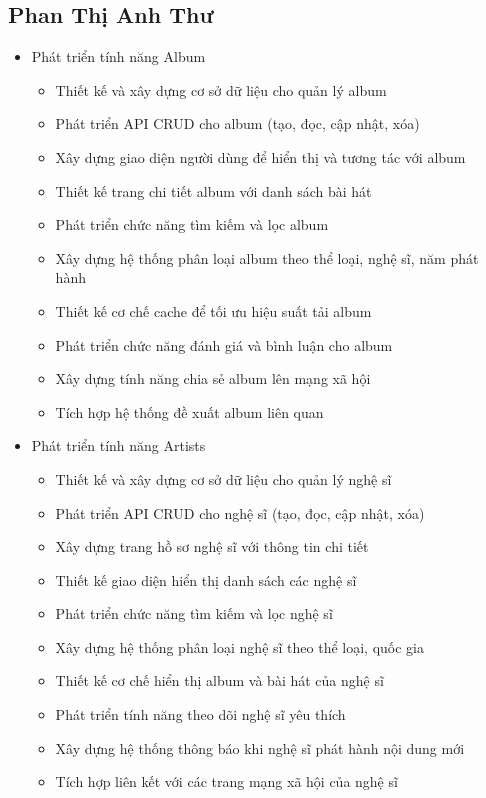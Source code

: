 \subsection{Phan Thị Anh Thư}
\begin{itemize}
    \item Phát triển tính năng Album
    \begin{itemize}
        \item Thiết kế và xây dựng cơ sở dữ liệu cho quản lý album
        \item Phát triển API CRUD cho album (tạo, đọc, cập nhật, xóa)
        \item Xây dựng giao diện người dùng để hiển thị và tương tác với album
        \item Thiết kế trang chi tiết album với danh sách bài hát
        \item Phát triển chức năng tìm kiếm và lọc album
        \item Xây dựng hệ thống phân loại album theo thể loại, nghệ sĩ, năm phát hành
        \item Thiết kế cơ chế cache để tối ưu hiệu suất tải album
        \item Phát triển chức năng đánh giá và bình luận cho album
        \item Xây dựng tính năng chia sẻ album lên mạng xã hội
        \item Tích hợp hệ thống đề xuất album liên quan
    \end{itemize}
    
    \item Phát triển tính năng Artists
    \begin{itemize}
        \item Thiết kế và xây dựng cơ sở dữ liệu cho quản lý nghệ sĩ
        \item Phát triển API CRUD cho nghệ sĩ (tạo, đọc, cập nhật, xóa)
        \item Xây dựng trang hồ sơ nghệ sĩ với thông tin chi tiết
        \item Thiết kế giao diện hiển thị danh sách các nghệ sĩ
        \item Phát triển chức năng tìm kiếm và lọc nghệ sĩ
        \item Xây dựng hệ thống phân loại nghệ sĩ theo thể loại, quốc gia
        \item Thiết kế cơ chế hiển thị album và bài hát của nghệ sĩ
        \item Phát triển tính năng theo dõi nghệ sĩ yêu thích
        \item Xây dựng hệ thống thông báo khi nghệ sĩ phát hành nội dung mới
        \item Tích hợp liên kết với các trang mạng xã hội của nghệ sĩ
    \end{itemize}
    

\end{itemize}
